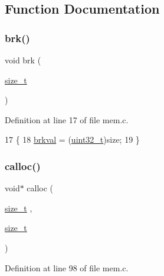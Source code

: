 \subsection{Function Documentation}
\mbox{\label{a00164_aebb0480990fb66ce618d040a195143c9_aebb0480990fb66ce618d040a195143c9}} 
\subsubsection{\texorpdfstring{brk()}{brk()}}
{\footnotesize\ttfamily void brk (\begin{DoxyParamCaption}\item[{\hyperlink{a00134_a29d85914ddff32967d85ada69854206d_a29d85914ddff32967d85ada69854206d}{size\+\_\+t}}]{ }\end{DoxyParamCaption})}



Definition at line 17 of file mem.\+c.


\begin{DoxyCode}
17                       \{
18     \hyperlink{a00161_a33fb44061f3432e7d04085bcef339974_a33fb44061f3432e7d04085bcef339974}{brkval} = (\hyperlink{a00134_a435d1572bf3f880d55459d9805097f62_a435d1572bf3f880d55459d9805097f62}{uint32\_t})size;
19 \}
\end{DoxyCode}
\mbox{\label{a00164_a77e880b1033d5a912be4333fc5d31eef_a77e880b1033d5a912be4333fc5d31eef}} 
\subsubsection{\texorpdfstring{calloc()}{calloc()}}
{\footnotesize\ttfamily void$\ast$ calloc (\begin{DoxyParamCaption}\item[{\hyperlink{a00134_a29d85914ddff32967d85ada69854206d_a29d85914ddff32967d85ada69854206d}{size\+\_\+t}}]{,  }\item[{\hyperlink{a00134_a29d85914ddff32967d85ada69854206d_a29d85914ddff32967d85ada69854206d}{size\+\_\+t}}]{ }\end{DoxyParamCaption})}



Definition at line 98 of file mem.\+c.


